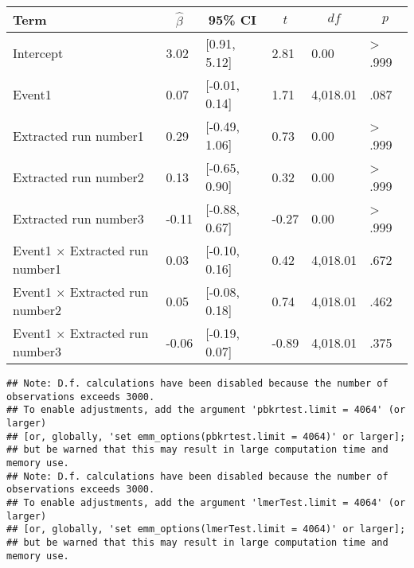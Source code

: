 \documentclass[
]{article}
\newenvironment{Shaded}{\begin{snugshade}}{\end{snugshade}}
\newcommand{\CommentTok}[1]{\textcolor[rgb]{0.56,0.35,0.01}{\textit{#1}}}
\newcommand{\FunctionTok}[1]{\textcolor[rgb]{0.00,0.00,0.00}{#1}}
\newcommand{\NormalTok}[1]{#1}
\newcommand{\SpecialCharTok}[1]{\textcolor[rgb]{0.00,0.00,0.00}{#1}}
\begin{document}
\begin{table}[tbp]

\begin{center}
\begin{threeparttable}

\caption{\label{tab:unnamed-chunk-8}}

\begin{tabular}{llllll}
\toprule
Term & \multicolumn{1}{c}{$\hat{\beta}$} & \multicolumn{1}{c}{95\% CI} & \multicolumn{1}{c}{$t$} & \multicolumn{1}{c}{$\mathit{df}$} & \multicolumn{1}{c}{$p$}\\
\midrule
Intercept & 3.02 & {}[0.91, 5.12] & 2.81 & 0.00 & > .999\\
Event1 & 0.07 & {}[-0.01, 0.14] & 1.71 & 4,018.01 & .087\\
Extracted run number1 & 0.29 & {}[-0.49, 1.06] & 0.73 & 0.00 & > .999\\
Extracted run number2 & 0.13 & {}[-0.65, 0.90] & 0.32 & 0.00 & > .999\\
Extracted run number3 & -0.11 & {}[-0.88, 0.67] & -0.27 & 0.00 & > .999\\
Event1 $\times$ Extracted run number1 & 0.03 & {}[-0.10, 0.16] & 0.42 & 4,018.01 & .672\\
Event1 $\times$ Extracted run number2 & 0.05 & {}[-0.08, 0.18] & 0.74 & 4,018.01 & .462\\
Event1 $\times$ Extracted run number3 & -0.06 & {}[-0.19, 0.07] & -0.89 & 4,018.01 & .375\\
\bottomrule
\end{tabular}

\end{threeparttable}
\end{center}

\end{table}

\begin{Shaded}
\end{Shaded}

\begin{verbatim}
## Note: D.f. calculations have been disabled because the number of observations exceeds 3000.
## To enable adjustments, add the argument 'pbkrtest.limit = 4064' (or larger)
## [or, globally, 'set emm_options(pbkrtest.limit = 4064)' or larger];
## but be warned that this may result in large computation time and memory use.
## Note: D.f. calculations have been disabled because the number of observations exceeds 3000.
## To enable adjustments, add the argument 'lmerTest.limit = 4064' (or larger)
## [or, globally, 'set emm_options(lmerTest.limit = 4064)' or larger];
## but be warned that this may result in large computation time and memory use.
\end{verbatim}
\end{document}
